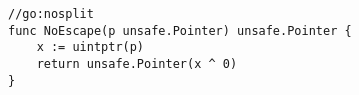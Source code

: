 \begin{lstlisting}[language=Golang, label=lst:labels-classexample-escape-analysis-escape, caption=Usage class example: escape-analysis-escape]
//go:nosplit
func NoEscape(p unsafe.Pointer) unsafe.Pointer {
    x := uintptr(p)
    return unsafe.Pointer(x ^ 0)
}
\end{lstlisting}